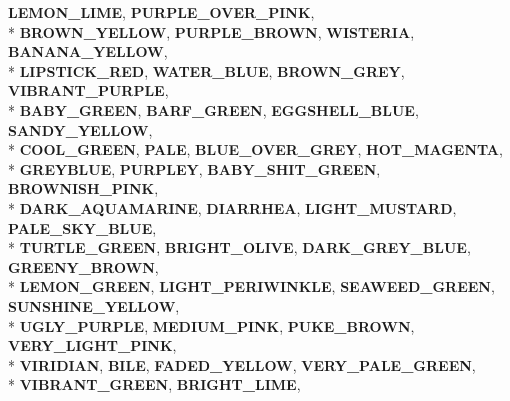 \begin{DoxyCompactItemize}
{\bfseries L\+E\+M\+O\+N\+\_\+\+L\+I\+ME}, 
{\bfseries P\+U\+R\+P\+L\+E\+\_\+\+O\+V\+E\+R\+\_\+\+P\+I\+NK}, 
\\*
{\bfseries B\+R\+O\+W\+N\+\_\+\+Y\+E\+L\+L\+OW}, 
{\bfseries P\+U\+R\+P\+L\+E\+\_\+\+B\+R\+O\+WN}, 
{\bfseries W\+I\+S\+T\+E\+R\+IA}, 
{\bfseries B\+A\+N\+A\+N\+A\+\_\+\+Y\+E\+L\+L\+OW}, 
\\*
{\bfseries L\+I\+P\+S\+T\+I\+C\+K\+\_\+\+R\+ED}, 
{\bfseries W\+A\+T\+E\+R\+\_\+\+B\+L\+UE}, 
{\bfseries B\+R\+O\+W\+N\+\_\+\+G\+R\+EY}, 
{\bfseries V\+I\+B\+R\+A\+N\+T\+\_\+\+P\+U\+R\+P\+LE}, 
\\*
{\bfseries B\+A\+B\+Y\+\_\+\+G\+R\+E\+EN}, 
{\bfseries B\+A\+R\+F\+\_\+\+G\+R\+E\+EN}, 
{\bfseries E\+G\+G\+S\+H\+E\+L\+L\+\_\+\+B\+L\+UE}, 
{\bfseries S\+A\+N\+D\+Y\+\_\+\+Y\+E\+L\+L\+OW}, 
\\*
{\bfseries C\+O\+O\+L\+\_\+\+G\+R\+E\+EN}, 
{\bfseries P\+A\+LE}, 
{\bfseries B\+L\+U\+E\+\_\+\+O\+V\+E\+R\+\_\+\+G\+R\+EY}, 
{\bfseries H\+O\+T\+\_\+\+M\+A\+G\+E\+N\+TA}, 
\\*
{\bfseries G\+R\+E\+Y\+B\+L\+UE}, 
{\bfseries P\+U\+R\+P\+L\+EY}, 
{\bfseries B\+A\+B\+Y\+\_\+\+S\+H\+I\+T\+\_\+\+G\+R\+E\+EN}, 
{\bfseries B\+R\+O\+W\+N\+I\+S\+H\+\_\+\+P\+I\+NK}, 
\\*
{\bfseries D\+A\+R\+K\+\_\+\+A\+Q\+U\+A\+M\+A\+R\+I\+NE}, 
{\bfseries D\+I\+A\+R\+R\+H\+EA}, 
{\bfseries L\+I\+G\+H\+T\+\_\+\+M\+U\+S\+T\+A\+RD}, 
{\bfseries P\+A\+L\+E\+\_\+\+S\+K\+Y\+\_\+\+B\+L\+UE}, 
\\*
{\bfseries T\+U\+R\+T\+L\+E\+\_\+\+G\+R\+E\+EN}, 
{\bfseries B\+R\+I\+G\+H\+T\+\_\+\+O\+L\+I\+VE}, 
{\bfseries D\+A\+R\+K\+\_\+\+G\+R\+E\+Y\+\_\+\+B\+L\+UE}, 
{\bfseries G\+R\+E\+E\+N\+Y\+\_\+\+B\+R\+O\+WN}, 
\\*
{\bfseries L\+E\+M\+O\+N\+\_\+\+G\+R\+E\+EN}, 
{\bfseries L\+I\+G\+H\+T\+\_\+\+P\+E\+R\+I\+W\+I\+N\+K\+LE}, 
{\bfseries S\+E\+A\+W\+E\+E\+D\+\_\+\+G\+R\+E\+EN}, 
{\bfseries S\+U\+N\+S\+H\+I\+N\+E\+\_\+\+Y\+E\+L\+L\+OW}, 
\\*
{\bfseries U\+G\+L\+Y\+\_\+\+P\+U\+R\+P\+LE}, 
{\bfseries M\+E\+D\+I\+U\+M\+\_\+\+P\+I\+NK}, 
{\bfseries P\+U\+K\+E\+\_\+\+B\+R\+O\+WN}, 
{\bfseries V\+E\+R\+Y\+\_\+\+L\+I\+G\+H\+T\+\_\+\+P\+I\+NK}, 
\\*
{\bfseries V\+I\+R\+I\+D\+I\+AN}, 
{\bfseries B\+I\+LE}, 
{\bfseries F\+A\+D\+E\+D\+\_\+\+Y\+E\+L\+L\+OW}, 
{\bfseries V\+E\+R\+Y\+\_\+\+P\+A\+L\+E\+\_\+\+G\+R\+E\+EN}, 
\\*
{\bfseries V\+I\+B\+R\+A\+N\+T\+\_\+\+G\+R\+E\+EN}, 
{\bfseries B\+R\+I\+G\+H\+T\+\_\+\+L\+I\+ME}, 

\end{DoxyCompactItemize}
